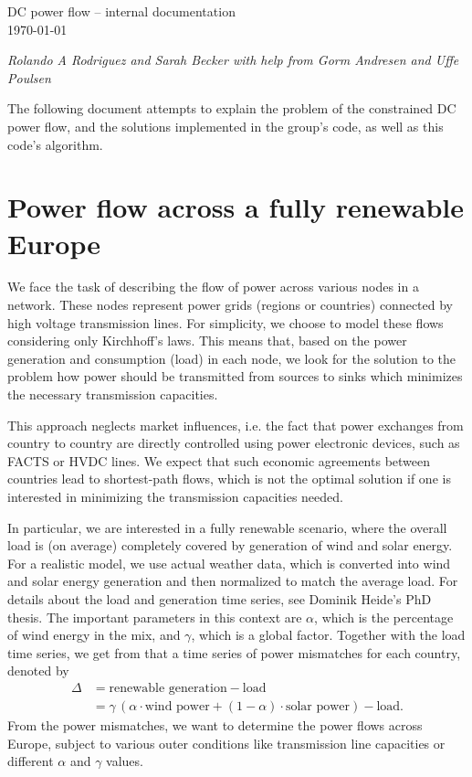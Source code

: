 \documentclass[english,twoside,a4paper,11pt]{article}
\numberwithin{equation}{section}
\begin{document}
\thispagestyle{empty}
\begin{center}
\begin{Large}
DC power flow -- internal documentation \\
\today\\
\end{Large}
{\it Rolando A Rodriguez and Sarah Becker with help from Gorm Andresen and Uffe Poulsen}
\end{center}

The following document attempts to explain the problem of the
constrained DC power flow, and the solutions implemented in the
group's code, as well as this code's algorithm. 

\section{Power flow across a fully renewable Europe}

We face the task of describing the flow of power across various nodes
in a network. These nodes represent power grids (regions or countries)
connected by high voltage transmission lines. For simplicity, we
choose to model these flows considering only Kirchhoff's laws. This
means that, based on the power generation and consumption (load) in
each node, we look for the solution to the problem how power should be
transmitted from sources to sinks which minimizes the necessary
transmission capacities. 

This approach neglects market influences, i.e. the fact that power
exchanges from country to country are directly controlled using power
electronic devices, such as FACTS or HVDC lines. We expect that such
economic agreements between countries lead to
shortest-path flows, which is not the optimal solution if one is
interested in minimizing the transmission capacities needed.

In particular, we are interested in a fully renewable scenario, where
the overall load is (on average) completely covered by generation of
wind and solar energy. For a realistic model, we use actual weather
data, which is converted into wind and solar energy generation and
then normalized to match the average load. For details about the load
and generation time series, see Dominik Heide's PhD thesis. The
important parameters in this context are $\alpha$, which is the
percentage of wind energy in the mix, and $\gamma$, which is a global
factor. Together with the load time series, we get from that a time
series of power mismatches for each country, denoted by
\begin{equation}
\begin{split}
\Delta &= \text{renewable generation} - \text{load}\\
&= \gamma\,(\alpha\cdot \text{wind power}+ (1-\alpha)\cdot\text{solar
  power}) - \text{load}.
\label{eq:powermismatch}
\end{split}
\end{equation}
From the power mismatches, we want to determine the
power flows across Europe, subject to various outer conditions like
transmission line capacities or different $\alpha$ and $\gamma$ values.
\end{document}

